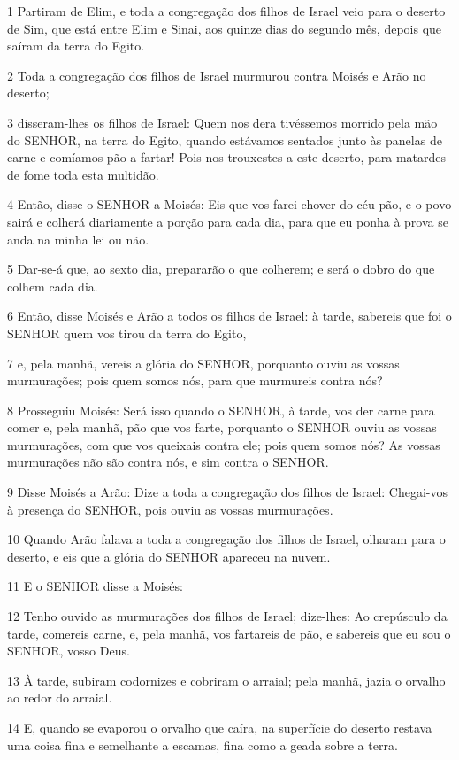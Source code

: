 \par 1 Partiram de Elim, e toda a congregação dos filhos de Israel veio para o deserto de Sim, que está entre Elim e Sinai, aos quinze dias do segundo mês, depois que saíram da terra do Egito.
\par 2 Toda a congregação dos filhos de Israel murmurou contra Moisés e Arão no deserto;
\par 3 disseram-lhes os filhos de Israel: Quem nos dera tivéssemos morrido pela mão do SENHOR, na terra do Egito, quando estávamos sentados junto às panelas de carne e comíamos pão a fartar! Pois nos trouxestes a este deserto, para matardes de fome toda esta multidão.
\par 4 Então, disse o SENHOR a Moisés: Eis que vos farei chover do céu pão, e o povo sairá e colherá diariamente a porção para cada dia, para que eu ponha à prova se anda na minha lei ou não.
\par 5 Dar-se-á que, ao sexto dia, prepararão o que colherem; e será o dobro do que colhem cada dia.
\par 6 Então, disse Moisés e Arão a todos os filhos de Israel: à tarde, sabereis que foi o SENHOR quem vos tirou da terra do Egito,
\par 7 e, pela manhã, vereis a glória do SENHOR, porquanto ouviu as vossas murmurações; pois quem somos nós, para que murmureis contra nós?
\par 8 Prosseguiu Moisés: Será isso quando o SENHOR, à tarde, vos der carne para comer e, pela manhã, pão que vos farte, porquanto o SENHOR ouviu as vossas murmurações, com que vos queixais contra ele; pois quem somos nós? As vossas murmurações não são contra nós, e sim contra o SENHOR.
\par 9 Disse Moisés a Arão: Dize a toda a congregação dos filhos de Israel: Chegai-vos à presença do SENHOR, pois ouviu as vossas murmurações.
\par 10 Quando Arão falava a toda a congregação dos filhos de Israel, olharam para o deserto, e eis que a glória do SENHOR apareceu na nuvem.
\par 11 E o SENHOR disse a Moisés:
\par 12 Tenho ouvido as murmurações dos filhos de Israel; dize-lhes: Ao crepúsculo da tarde, comereis carne, e, pela manhã, vos fartareis de pão, e sabereis que eu sou o SENHOR, vosso Deus.
\par 13 À tarde, subiram codornizes e cobriram o arraial; pela manhã, jazia o orvalho ao redor do arraial.
\par 14 E, quando se evaporou o orvalho que caíra, na superfície do deserto restava uma coisa fina e semelhante a escamas, fina como a geada sobre a terra.
